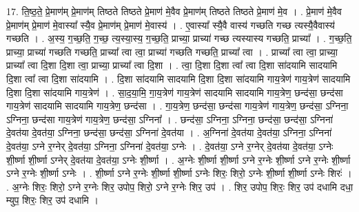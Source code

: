 \documentclass[17pt]{extarticle}
\begin{document}
17. ति॒ष्ठ॒ते॒ प्रे॒माण॑म् प्रे॒माण॑म् तिष्ठते तिष्ठते प्रे॒माण॑ मे॒वैव प्रे॒माण॑म् तिष्ठते तिष्ठते प्रे॒माण॑ मे॒व । . प्रे॒माण॑ मे॒वैव प्रे॒माण॑म् प्रे॒माण॑ मे॒वास्या᳚ स्यै॒व प्रे॒माण॑म् प्रे॒माण॑ मे॒वास्य॑ । . ए॒वास्या᳚ स्यै॒वै वास्य॑ गच्छति गच्छ त्यस्यै॒वैवास्य॑ गच्छति । . अ॒स्य॒ ग॒च्छ॒ति॒ ग॒च्छ॒ त्य॒स्या॒स्य॒ ग॒च्छ॒ति॒ प्राच्या॒ प्राच्या॑ गच्छ त्यस्यास्य गच्छति॒ प्राच्या᳚ । . ग॒च्छ॒ति॒ प्राच्या॒ प्राच्या॑ गच्छति गच्छति॒ प्राच्या᳚ त्वा त्वा॒ प्राच्या॑ गच्छति गच्छति॒ प्राच्या᳚ त्वा । . प्राच्या᳚ त्वा त्वा॒ प्राच्या॒ प्राच्या᳚ त्वा दि॒शा दि॒शा त्वा॒ प्राच्या॒ प्राच्या᳚ त्वा दि॒शा । . त्वा॒ दि॒शा दि॒शा त्वा᳚ त्वा दि॒शा सा॑दयामि सादयामि दि॒शा त्वा᳚ त्वा दि॒शा सा॑दयामि । . दि॒शा सा॑दयामि सादयामि दि॒शा दि॒शा सा॑दयामि गाय॒त्रेण॑ गाय॒त्रेण॑ सादयामि दि॒शा दि॒शा सा॑दयामि गाय॒त्रेण॑ । . सा॒द॒या॒मि॒ गा॒य॒त्रेण॑ गाय॒त्रेण॑ सादयामि सादयामि गाय॒त्रेण॒ छन्द॑सा॒ छन्द॑सा गाय॒त्रेण॑ सादयामि सादयामि गाय॒त्रेण॒ छन्द॑सा । . गा॒य॒त्रेण॒ छन्द॑सा॒ छन्द॑सा गाय॒त्रेण॑ गाय॒त्रेण॒ छन्द॑सा॒ ऽग्निना॒ ऽग्निना॒ छन्द॑सा गाय॒त्रेण॑ गाय॒त्रेण॒ छन्द॑सा॒ ऽग्निना᳚ । . छन्द॑सा॒ ऽग्निना॒ ऽग्निना॒ छन्द॑सा॒ छन्द॑सा॒ ऽग्निना॑ दे॒वत॑या दे॒वत॑या॒ ऽग्निना॒ छन्द॑सा॒ छन्द॑सा॒ ऽग्निना॑ दे॒वत॑या । . अ॒ग्निना॑ दे॒वत॑या दे॒वत॑या॒ ऽग्निना॒ ऽग्निना॑ दे॒वत॑या॒ ऽग्ने र॒ग्नेर् दे॒वत॑या॒ ऽग्निना॒ ऽग्निना॑ दे॒वत॑या॒ ऽग्नेः । . दे॒वत॑या॒ ऽग्ने र॒ग्नेर् दे॒वत॑या दे॒वत॑या॒ ऽग्नेः शी॒र्ष्णा शी॒र्ष्णा ऽग्नेर् दे॒वत॑या दे॒वत॑या॒ ऽग्नेः शी॒र्ष्णा । . अ॒ग्नेः शी॒र्ष्णा शी॒र्ष्णा ऽग्ने र॒ग्नेः शी॒र्ष्णा ऽग्ने र॒ग्नेः शी॒र्ष्णा ऽग्ने र॒ग्नेः शी॒र्ष्णा ऽग्नेः । . शी॒र्ष्णा ऽग्ने र॒ग्नेः शी॒र्ष्णा शी॒र्ष्णा ऽग्नेः शिरः॒ शिरो॒ ऽग्नेः शी॒र्ष्णा शी॒र्ष्णा ऽग्नेः शिरः॑ । . अ॒ग्नेः शिरः॒ शिरो॒ ऽग्ने र॒ग्नेः शिर॒ उपोप॒ शिरो॒ ऽग्ने र॒ग्नेः शिर॒ उप॑ । . शिर॒ उपोप॒ शिरः॒ शिर॒ उप॑ दधामि दधा॒ म्युप॒ शिरः॒ शिर॒ उप॑ दधामि । \newline
\end{document}
